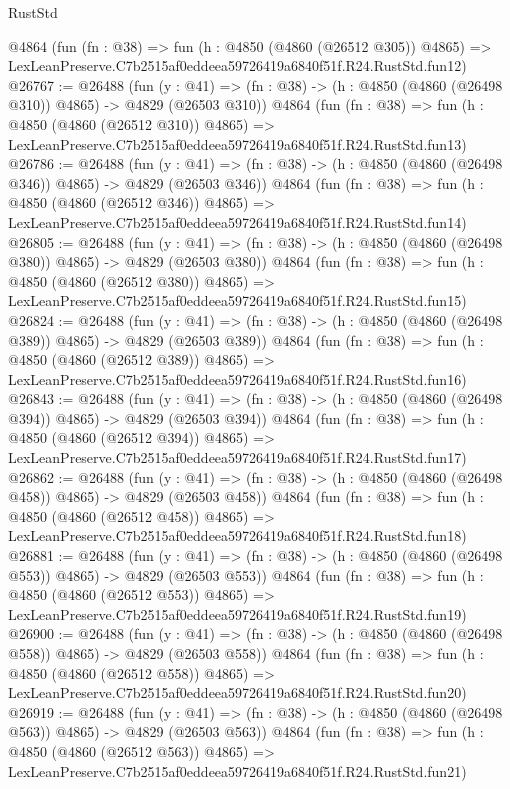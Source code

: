 \begin{lexlean}{RustStd}
\begin{coremodule}
    @4864
    (fun (fn : @38) =>
    fun (h : @4850 (@4860 (@26512 @305)) @4865) =>
    LexLeanPreserve.C7b2515af0eddeea59726419a6840f51f.R24.RustStd.fun12)
@26767 := @26488
    (fun (y : @41) => (fn : @38) -> (h : @4850 (@4860 (@26498 @310)) @4865) -> @4829 (@26503 @310))
    @4864
    (fun (fn : @38) =>
    fun (h : @4850 (@4860 (@26512 @310)) @4865) =>
    LexLeanPreserve.C7b2515af0eddeea59726419a6840f51f.R24.RustStd.fun13)
@26786 := @26488
    (fun (y : @41) => (fn : @38) -> (h : @4850 (@4860 (@26498 @346)) @4865) -> @4829 (@26503 @346))
    @4864
    (fun (fn : @38) =>
    fun (h : @4850 (@4860 (@26512 @346)) @4865) =>
    LexLeanPreserve.C7b2515af0eddeea59726419a6840f51f.R24.RustStd.fun14)
@26805 := @26488
    (fun (y : @41) => (fn : @38) -> (h : @4850 (@4860 (@26498 @380)) @4865) -> @4829 (@26503 @380))
    @4864
    (fun (fn : @38) =>
    fun (h : @4850 (@4860 (@26512 @380)) @4865) =>
    LexLeanPreserve.C7b2515af0eddeea59726419a6840f51f.R24.RustStd.fun15)
@26824 := @26488
    (fun (y : @41) => (fn : @38) -> (h : @4850 (@4860 (@26498 @389)) @4865) -> @4829 (@26503 @389))
    @4864
    (fun (fn : @38) =>
    fun (h : @4850 (@4860 (@26512 @389)) @4865) =>
    LexLeanPreserve.C7b2515af0eddeea59726419a6840f51f.R24.RustStd.fun16)
@26843 := @26488
    (fun (y : @41) => (fn : @38) -> (h : @4850 (@4860 (@26498 @394)) @4865) -> @4829 (@26503 @394))
    @4864
    (fun (fn : @38) =>
    fun (h : @4850 (@4860 (@26512 @394)) @4865) =>
    LexLeanPreserve.C7b2515af0eddeea59726419a6840f51f.R24.RustStd.fun17)
@26862 := @26488
    (fun (y : @41) => (fn : @38) -> (h : @4850 (@4860 (@26498 @458)) @4865) -> @4829 (@26503 @458))
    @4864
    (fun (fn : @38) =>
    fun (h : @4850 (@4860 (@26512 @458)) @4865) =>
    LexLeanPreserve.C7b2515af0eddeea59726419a6840f51f.R24.RustStd.fun18)
@26881 := @26488
    (fun (y : @41) => (fn : @38) -> (h : @4850 (@4860 (@26498 @553)) @4865) -> @4829 (@26503 @553))
    @4864
    (fun (fn : @38) =>
    fun (h : @4850 (@4860 (@26512 @553)) @4865) =>
    LexLeanPreserve.C7b2515af0eddeea59726419a6840f51f.R24.RustStd.fun19)
@26900 := @26488
    (fun (y : @41) => (fn : @38) -> (h : @4850 (@4860 (@26498 @558)) @4865) -> @4829 (@26503 @558))
    @4864
    (fun (fn : @38) =>
    fun (h : @4850 (@4860 (@26512 @558)) @4865) =>
    LexLeanPreserve.C7b2515af0eddeea59726419a6840f51f.R24.RustStd.fun20)
@26919 := @26488
    (fun (y : @41) => (fn : @38) -> (h : @4850 (@4860 (@26498 @563)) @4865) -> @4829 (@26503 @563))
    @4864
    (fun (fn : @38) =>
    fun (h : @4850 (@4860 (@26512 @563)) @4865) =>
    LexLeanPreserve.C7b2515af0eddeea59726419a6840f51f.R24.RustStd.fun21)

\end{coremodule}
\end{lexlean}

